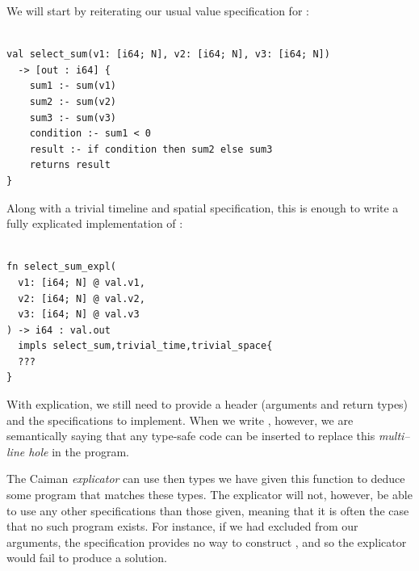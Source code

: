We will start by reiterating our usual value specification for :
%
\begin{lstlisting}

val select_sum(v1: [i64; N], v2: [i64; N], v3: [i64; N]) 
  -> [out : i64] {
    sum1 :- sum(v1)
    sum2 :- sum(v2)
    sum3 :- sum(v3)
    condition :- sum1 < 0
    result :- if condition then sum2 else sum3
    returns result
}
\end{lstlisting}
%
Along with a trivial timeline and spatial specification, this is enough to write a fully explicated implementation of :
%
\begin{lstlisting}

fn select_sum_expl(
  v1: [i64; N] @ val.v1,
  v2: [i64; N] @ val.v2,
  v3: [i64; N] @ val.v3
) -> i64 : val.out 
  impls select_sum,trivial_time,trivial_space{
  ???
}
\end{lstlisting}
%
With explication, we still need to provide a header (arguments and return types) and the specifications to implement.  When we write , however, we are semantically saying that any type-safe code can be inserted to replace this \emph{multi--line hole} in the program.

The Caiman \emph{explicator} can use then types we have given this function to deduce some program that matches these types.  The explicator will not, however, be able to use any other specifications than those given, meaning that it is often the case that no such program exists.  For instance, if we had excluded  from our arguments, the  specification provides no way to construct , and so the explicator would fail to produce a solution.

